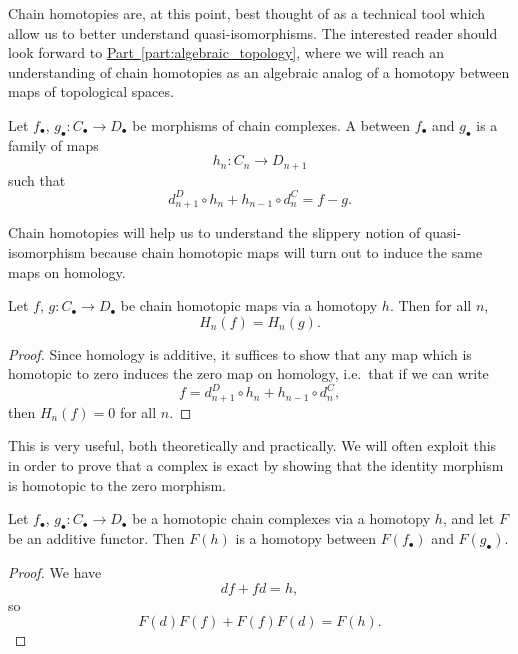 \documentclass[main.tex]{subfiles}
\begin{document}
Chain homotopies are, at this point, best thought of as a technical tool which allow us to better understand quasi-isomorphisms. The interested reader should look forward to \hyperref[part:algebraic_topology]{Part~\ref*{part:algebraic_topology}}, where we will reach an understanding of chain homotopies as an algebraic analog of a homotopy between maps of topological spaces.

\begin{definition}
  \label{def:chain_homotopy}
  Let $f_{\bullet}$, $g_{\bullet}\colon C_{\bullet} \to D_{\bullet}$ be morphisms of chain complexes. A  between $f_{\bullet}$ and $g_{\bullet}$ is a family of maps
  \begin{equation*}
    h_{n}\colon C_{n} \to D_{n+1}
  \end{equation*}
  such that
  \begin{equation*}
    d^{D}_{n+1} \circ h_{n} + h_{n-1} \circ d^{C}_{n} = f - g.
  \end{equation*}
\end{definition}

Chain homotopies will help us to understand the slippery notion of quasi-isomorphism because chain homotopic maps will turn out to induce the same maps on homology.

\begin{proposition}
  Let $f$, $g\colon C_{\bullet} \to D_{\bullet}$ be chain homotopic maps via a homotopy $h$. Then for all $n$,
  \begin{equation*}
    H_{n}(f) = H_{n}(g).
  \end{equation*}
\end{proposition}
\begin{proof}
  Since homology is additive, it suffices to show that any map which is homotopic to zero induces the zero map on homology, i.e.\ that if we can write
  \begin{equation*}
    f = d^{D}_{n+1} \circ h_{n} + h_{n-1} \circ d^{C}_{n},
  \end{equation*}
  then $H_{n}(f) = 0$ for all $n$.
\end{proof}

This is very useful, both theoretically and practically. We will often exploit this in order to prove that a complex is exact by showing that the identity morphism is homotopic to the zero morphism.

\begin{lemma}
  \label{lemma:additive_functors_preserve_homotopy}
  Let $f_{\bullet}$, $g_{\bullet}\colon C_{\bullet} \to D_{\bullet}$ be a homotopic chain complexes via a homotopy $h$, and let $F$ be an additive functor. Then $F(h)$ is a homotopy between $F(f_{\bullet})$ and $F(g_{\bullet})$.
\end{lemma}
\begin{proof}
  We have
  \begin{equation*}
    df + fd = h,
  \end{equation*}
  so
  \begin{equation*}
    F(d)F(f) + F(f)F(d) = F(h).
  \end{equation*}
\end{proof}
\end{document}
